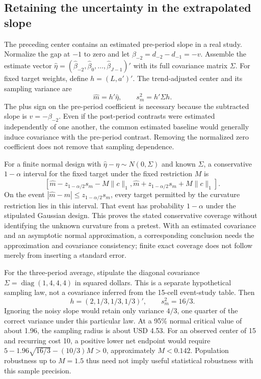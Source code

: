 \subsection{Retaining the uncertainty in the extrapolated slope}

The preceding center contains an estimated pre-period slope in a real study.
Normalize the gap at $-1$ to zero and let
$\beta_{-2}=d_{-2}-d_{-1}=-v$. Assemble the estimate vector
$\widehat\eta=(\widehat\beta_{-2},\widehat\beta_0,\ldots,
\widehat\beta_{J-1})'$ with its full covariance matrix $\Sigma$.
For fixed target weights, define $h=(L,a')'$. The trend-adjusted center
and its sampling variance are
\begin{equation}
 \widehat m=h'\widehat\eta,\qquad s_m^2=h'\Sigma h.
 \label{exec17:s6-noisy-slope}
\end{equation}
The plus sign on the pre-period coefficient is necessary because the
subtracted slope is $v=-\beta_{-2}$. Even if the post-period contrasts
were estimated independently of one another, the common estimated baseline
would generally induce covariance with the pre-period contrast. Removing the
normalized zero coefficient does not remove that sampling dependence.

For a finite normal design with
$\widehat\eta-\eta\sim N(0,\Sigma)$ and known $\Sigma$, a conservative
$1-\alpha$ interval for the fixed target under the fixed restriction $M$ is
\begin{equation}
 \left[\widehat m-z_{1-\alpha/2}s_m-M\|c\|_1,
       \widehat m+z_{1-\alpha/2}s_m+M\|c\|_1\right].
 \label{exec17:s6-normal-interval}
\end{equation}
On the event $|\widehat m-m|\leq z_{1-\alpha/2}s_m$, every target
permitted by the curvature restriction lies in this interval. That event
has probability $1-\alpha$ under the stipulated Gaussian design. This
proves the stated conservative coverage without identifying the unknown
curvature from a pretest. With an estimated covariance and an asymptotic
normal approximation, a corresponding conclusion needs the approximation
and covariance consistency; finite exact coverage does not follow merely
from inserting a standard error.

For the three-period average, stipulate the diagonal covariance
$\Sigma=\operatorname{diag}(1,4,4,4)$ in squared dollars. This is a
separate hypothetical sampling law, not a covariance inferred from the
15-cell event-study table. Then
\begin{equation}
 h=(2,1/3,1/3,1/3)',\qquad s_m^2=16/3.
 \label{exec17:s6-normal-design}
\end{equation}
Ignoring the noisy slope would retain only variance $4/3$, one quarter
of the correct variance under this particular law. At a 95\% normal
critical value of about 1.96, the sampling radius is about USD 4.53.
For an observed center of 15 and recurring cost 10, a positive lower
net endpoint would require
$5-1.96\sqrt{16/3}-(10/3)M>0$, approximately $M<0.142$.
Population robustness up to $M=1.5$ thus need not imply useful statistical
robustness with this sample precision.

